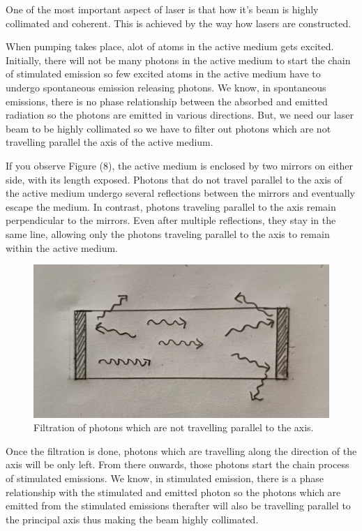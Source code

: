 \documentclass[12pt]{article}
\begin{document}
One of the most important aspect of laser is that how it's beam is highly collimated and coherent. This is achieved by the way how lasers are constructed. \vspace{.2cm}

When pumping takes place, alot of atoms in the active medium gets excited. Initially, there will not be many photons in the active medium to start the chain of stimulated emission so few excited atoms in the active medium have to undergo spontaneous emission releasing photons. We know, in spontaneous emissions, there is no phase relationship between the absorbed and emitted radiation so the photons are emitted in various directions. But, we need our laser beam to be highly collimated so we have to filter out photons which are not travelling parallel the axis of the active medium. \vspace{.2cm}

If you observe Figure (8), the active medium is enclosed by two mirrors on either side, with its length exposed. Photons that do not travel parallel to the axis of the active medium undergo several reflections between the mirrors and eventually escape the medium. In contrast, photons traveling parallel to the axis remain perpendicular to the mirrors. Even after multiple reflections, they stay in the same line, allowing only the photons traveling parallel to the axis to remain within the active medium.

\begin{figure}[H]
    \centering
    \includegraphics[scale=.6]{./img/12_filtration.png}
    \caption{Filtration of photons which are not travelling parallel to the axis.}
\end{figure}

Once the filtration is done, photons which are travelling along the direction of the axis will be only left. From there onwards, those photons start the chain process of stimulated emissions. We know, in stimulated emission, there is a phase relationship with the stimulated and emitted photon so the photons which are emitted from the stimulated emissions therafter will also be travelling parallel to the principal axis thus making the beam highly collimated. \vspace{.2cm}
\end{document}
